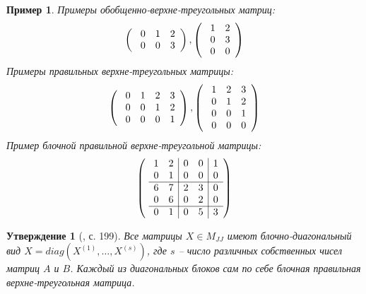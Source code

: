 \documentclass[11pt, a4paper]{article}
\newtheorem{example}{Пример}
\newtheorem{statement}{Утверждение}
\begin{document}
\begin{example}
    Примеры обобщенно-верхне-треугольных матриц:
    $$
    \left(\
        \begin{array}{c c c}
            0 & 1 & 2 \\
            0 & 0 & 3 \\
        \end{array}
    \right), 
    \left(\
        \begin{array}{c c }
            1 & 2 \\
            0 & 3 \\
            0 & 0 \\
        \end{array}
    \right)
    $$
    Примеры правильных верхне-треугольных матрицы:
    $$
    \left(\
        \begin{array}{c c c c}
            0 & 1 & 2 & 3 \\
            0 & 0 & 1 & 2 \\
            0 & 0 & 0 & 1 \\
        \end{array}
    \right), 
    \left(\
        \begin{array}{c c c}
            1 & 2 & 3 \\
            0 & 1 & 2 \\
            0 & 0 & 1 \\
            0 & 0 & 0 \\
        \end{array}
    \right)
    $$
    Пример блочной правильной верхне-треугольной матрицы:
    $$
    \left(\
        \begin{array}{c c | c c | c}
            1 & 2 & 0 & 0 & 1 \\
            0 & 1 & 0 & 0 & 0 \\
            \hline
            6 & 7 & 2 & 3 & 0 \\
            0 & 6 & 0 & 2 & 0 \\
            \hline
            0 & 1 & 0 & 5 & 3 \\
        \end{array}
    \right)
    $$
\end{example}

\begin{statement}[\cite{Gantmacher}, с. 199]
    Все матрицы $X \in M_{JJ}$ имеют блочно-диагональный вид $X = diag(X^{(1)}, \dots, X^{(s)})$, где $s$ -- 
    число различных собственных чисел матриц $A$ и $B$. Каждый из диагональных блоков 
    сам по себе блочная правильная верхне-треугольная матрица.
\end{statement}
\end{document}
